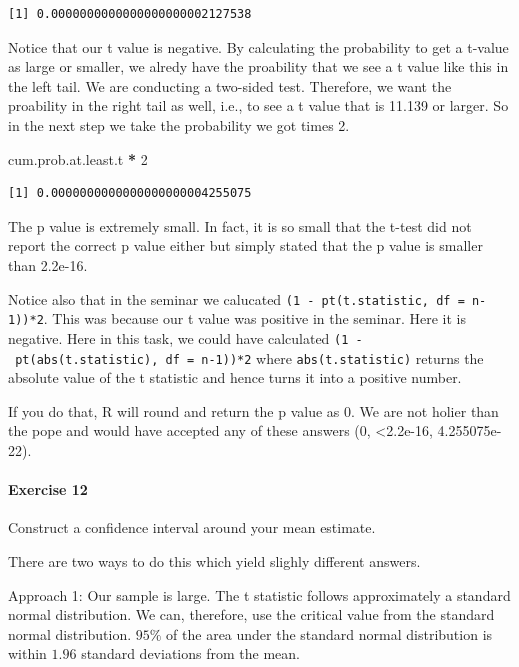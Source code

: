 \documentclass[]{article}
\newenvironment{Shaded}{\begin{snugshade}}{\end{snugshade}}
\newcommand{\DecValTok}[1]{\textcolor[rgb]{0.00,0.00,0.81}{#1}}
\newcommand{\StringTok}[1]{\textcolor[rgb]{0.31,0.60,0.02}{#1}}
\newcommand{\OperatorTok}[1]{\textcolor[rgb]{0.81,0.36,0.00}{\textbf{#1}}}
\newcommand{\NormalTok}[1]{#1}
\let\oldparagraph\paragraph
\renewcommand{\paragraph}[1]{\oldparagraph{#1}\mbox{}}
\theoremstyle{definition}
\theoremstyle{definition}
\theoremstyle{definition}
\theoremstyle{remark}
\begin{document}
\begin{verbatim}
[1] 0.0000000000000000000002127538
\end{verbatim}

Notice that our t value is negative. By calculating the probability to
get a t-value as large or smaller, we alredy have the proability that we
see a t value like this in the left tail. We are conducting a two-sided
test. Therefore, we want the proability in the right tail as well, i.e.,
to see a t value that is 11.139 or larger. So in the next step we take
the probability we got times 2.

\begin{Shaded}
\begin{Highlighting}[]
\NormalTok{cum.prob.at.least.t }\OperatorTok{*}\StringTok{ }\DecValTok{2}
\end{Highlighting}
\end{Shaded}

\begin{verbatim}
[1] 0.0000000000000000000004255075
\end{verbatim}

The p value is extremely small. In fact, it is so small that the t-test
did not report the correct p value either but simply stated that the p
value is smaller than 2.2e-16.

Notice also that in the seminar we calucated
\texttt{(1\ -\ pt(t.statistic,\ df\ =\ n-1))*2}. This was because our t
value was positive in the seminar. Here it is negative. Here in this
task, we could have calculated
\texttt{(1\ -\ pt(abs(t.statistic),\ df\ =\ n-1))*2} where
\texttt{abs(t.statistic)} returns the absolute value of the t statistic
and hence turns it into a positive number.

If you do that, R will round and return the p value as 0. We are not
holier than the pope and would have accepted any of these answers (0,
\textless{}2.2e-16, 4.255075e-22).

\paragraph{Exercise 12}\label{exercise-12-1}

Construct a confidence interval around your mean estimate.

There are two ways to do this which yield slighly different answers.

Approach 1: Our sample is large. The t statistic follows approximately a
standard normal distribution. We can, therefore, use the critical value
from the standard normal distribution. \(95\%\) of the area under the
standard normal distribution is within \(1.96\) standard deviations from
the mean.
\end{document}
